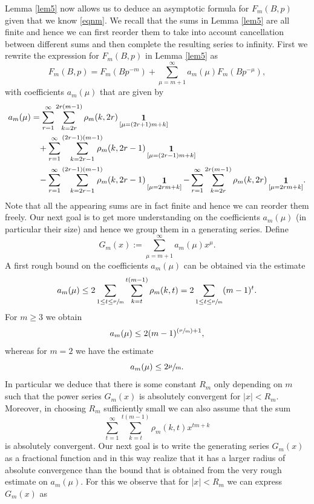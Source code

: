 \documentclass[JEP,XML,SOM,Unicode,published]{cedram}
\newcommand{\Psfrac}[2]{(\sfrac{#1}{#2})}
\DeclareMathOperator{\id}{\mathbf{1}}
\theoremstyle{definition}
\numberwithin{theorem}{section}
\begin{document}
Lemma \ref{lem5} now allows us to deduce an asymptotic formula for $F_m(B,p)$ given that we know \eqref{eqnm}. We recall that the sums in Lemma \ref{lem5} are all finite and hence we can first reorder them to take into account cancellation between different sums and then complete the resulting series to infinity. First we rewrite the expression for $F_m(B,p)$ in Lemma \ref{lem5} as
\begin{equation}\label{eqn25}
F_m(B,p) = F_m(Bp^{-m}) +\sum_{\mu=m+1}^\infty a_m(\mu) F_m(Bp^{-\mu}),
\end{equation}
with coefficients $a_m(\mu)$ that are given by
\begin{equation*}
\begin{split}
a_m(\mu)&=\sum_{r=1}^{\infty} \sum_{k=2r}^{2r(m-1)}\rho_m(k,2r)\id_{[\mu=(2r+1)m+k]}\\
&\hspace*{3mm}+ \sum_{r=1}^\infty\sum_{k=2r-1}^{(2r-1)(m-1)}\hspace*{-3mm}\rho_m(k,2r-1)\id_{[\mu=(2r-1)m+k]}\\
&\hspace*{3mm}-\sum_{r=1}^\infty \sum_{k=2r-1}^{(2r-1)(m-1)}\hspace*{-3mm}\rho_m(k,2r-1)\id_{[\mu=2rm+k]}-\sum_{r=1}^\infty\sum_{k=2r}^{2r(m-1)}\rho_m(k,2r)\id_{[\mu=2rm+k]}\!.
\end{split}
\end{equation*}
Note that all the appearing sums are in fact finite and hence we can reorder them freely. Our next goal is to get more understanding on the coefficients $a_m(\mu)$ (in particular their size) and hence we group them in a generating series. Define
\[
G_m(x):=\sum_{\mu=m+1}^\infty a_m(\mu) x^\mu.
\]
A first rough bound on the coefficients $a_m(\mu)$ can be obtained via the estimate
\[
a_m(\mu)\leq 2\sum_{1\leq t\leq \sfrac{\mu}{m}} \sum_{k=t}^{t(m-1)}\rho_m(k,t)= 2 \sum_{1\leq t\leq \sfrac{\mu}{m}} (m-1)^t .
\]
For $m\geq 3$ we obtain
\[
a_m(\mu)\leq 2(m-1)^{\Psfrac{\mu}{m}+1},
\]
whereas for $m=2$ we have the estimate
\[
a_m(\mu)\leq 2 \sfrac{\mu}{m}.
\]
In particular we deduce that there is some constant $R_m$ only depending on $m$ such that the power series $G_m(x)$ is absolutely convergent for $|x|<R_m$. Moreover, in choosing $R_m$ sufficiently small we can also assume that the sum
\[
\sum_{t=1}^{\infty} \sum_{k=t}^{t(m-1)}\rho_m(k,t)x^{tm+k}
\]
is absolutely convergent. Our next goal is to write the generating series $G_m(x)$ as a fractional function and in this way realize that it has a larger radius of absolute convergence than the bound that is obtained from the very rough estimate on $a_m(\mu)$. For this we observe that for $|x|<R_m$ we can express $G_m(x)$ as
\end{document}
